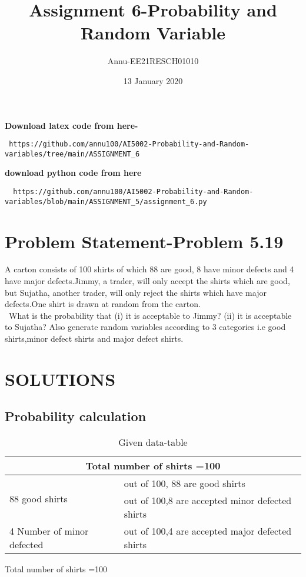 \documentclass[journel,12pt,twocoloums]{IEEEtran}
\title{Assignment 6-Probability and Random Variable}
\author{Annu-EE21RESCH01010}
\date{13 January 2020}
\begin{document}
 \maketitle
\textbf{Download latex code from here-}\\
\begin{lstlisting}
 https://github.com/annu100/AI5002-Probability-and-Random-variables/tree/main/ASSIGNMENT_6
 \end{lstlisting}
 \textbf{download python code from here}\\
 \begin{lstlisting}
  https://github.com/annu100/AI5002-Probability-and-Random-variables/blob/main/ASSIGNMENT_5/assignment_6.py
 \end{lstlisting}
 \section{Problem Statement-Problem 5.19}
 A carton consists of 100 shirts of which 88
are good, 8 have minor defects and 4 have
major defects.Jimmy, a trader, will only accept
the shirts which are good, but Sujatha, another
trader, will only reject the shirts which have
major defects.One shirt is drawn at random
from the carton. \\\ What is the probability that 
(i) it is acceptable to Jimmy?
(ii) it is acceptable to Sujatha?
Also generate random variables according to 3 categories i.e good shirts,minor defect shirts and major defect shirts.
\section{SOLUTIONS}
\subsection{Probability calculation}
\begin{table}[ht]
\caption{Given data-table}
\begin{center}
\begin{tabular}{|p{4cm}|p{4cm}|}
\hline
\multicolumn{2}{|c|}{\textbf{Total number of shirts =100}}\\ \hline \hline
\multirow{2}{*}{88 good shirts} & out of 100, 88 are good shirts

\\
\hline
\multirow{2}{*}{8 Number of minor defected  } & out of 100,8 are accepted minor defected shirts\\ \hline
\multirow{2}{*}{4 Number of minor defected } & out of 100,4 are accepted major defected shirts\\ \hline
\hline
\end{tabular}
\end{center}
\end{table}
Total number of shirts =100\\ 
\end{document}
